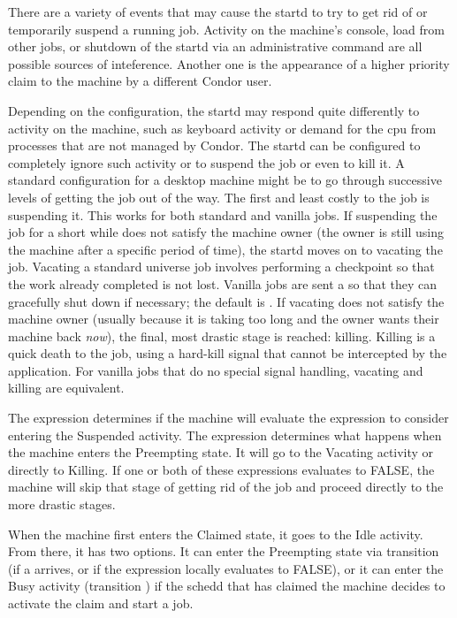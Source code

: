 There are a variety of events that may cause the startd to try to get
rid of or temporarily suspend a running job.  Activity on the
machine's console, load from other jobs, or shutdown of the startd via
an administrative command are all possible sources of inteference.
Another one is the appearance of a higher priority claim to the
machine by a different Condor user.

Depending on the configuration, the startd may respond quite
differently to activity on the machine, such as keyboard activity or
demand for the cpu from processes that are not managed by Condor.  The
startd can be configured to completely ignore such activity or to
suspend the job or even to kill it.  A standard configuration for a desktop
machine might be to go through
successive levels of getting the job out of the way.
The first and least costly to the job is suspending it.
This works for both standard and vanilla jobs.
If suspending the job for a short while does not satisfy the machine
owner (the owner is still using the machine after a specific period of
time), the startd moves on to vacating the job.
Vacating a standard universe job
involves performing a checkpoint so that the work already completed
is not lost.  Vanilla jobs are sent a  so that they
can gracefully shut down if necessary; the default is \verb@SIGTERM@.
If vacating does not satisfy the machine owner (usually because it is
taking too long and the owner wants their machine back \emph{now}),
the final, most drastic stage is reached: killing.  
Killing is a quick death to the job, using a hard-kill signal that cannot
be intercepted by the application.  For vanilla jobs that do no special
signal handling, vacating and killing are equivalent.

The  expression determines if the machine will
evaluate the  expression to consider entering the
Suspended activity.
The  expression determines what happens when the
machine enters the Preempting state.
It will go to the Vacating
activity or directly to Killing. 
If one or both of these expressions evaluates to FALSE, the machine
will skip that stage of getting rid of the job and proceed directly to
the more drastic stages.

When the machine first enters the Claimed state, it goes to the Idle
activity.  From there, it has two options.  
It can enter the Preempting state via transition  (if a 
 arrives, or if the  expression locally
evaluates to FALSE),  
or it can enter the Busy activity (transition ) if the
schedd that has claimed the machine decides to activate the claim and
start a job.

